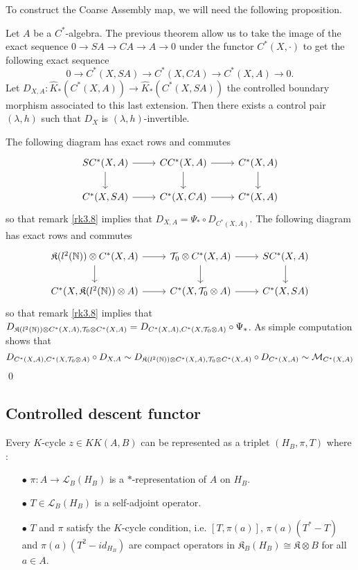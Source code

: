 To construct the Coarse Assembly map, we will need the following proposition. 

\begin{prop}
Let $A$ be a $C^*$-algebra. The previous theorem allow us to take the image of the exact sequence $0 \rightarrow SA \rightarrow CA \rightarrow A \rightarrow 0 $ under the functor $C^*(X,\cdot)$ to get the following exact sequence 
\[0 \rightarrow C^*(X,SA) \rightarrow C^*(X,CA) \rightarrow C^*(X,A) \rightarrow 0.\] 
Let $D_{X,A} : \hat K_*(C^*(X,A))\rightarrow \hat K_*(C^*(X,SA))$ the controlled boundary morphism associated to this last extension. Then there exists a control pair $(\lambda,h)$ such that $D_X$ is $(\lambda,h)$-invertible.
\end{prop}

\begin{dem}
The following diagram has exact rows and commutes
\[\begin{tikzcd} 
SC^*(X,A) \arrow{d}\arrow{r} & CC^*(X,A) \arrow{d}\arrow{r} & C^*(X,A) \arrow{d} \\ 
C^*(X,SA) \arrow{r}          & C^*(X,CA) \arrow{r}          & C^*(X,A)
\end{tikzcd}\]
so that remark \ref{rk3.8} implies that $D_{X,A} = \Psi_*\circ D_{C^*(X,A)}$. The following diagram has exact rows and commutes
\[\begin{tikzcd} 
\mathfrak K(l^2(\N))\otimes C^*(X,A) \arrow{d}\arrow{r} & \mathcal T_0 \otimes C^*(X,A) \arrow{d}\arrow{r} & SC^*(X,A) \arrow{d} \\ 
C^*(X,\mathfrak K(l^2(\N))\otimes A) \arrow{r}          & C^*(X,\mathcal T_0 \otimes A) \arrow{r}          & C^*(X,SA)
\end{tikzcd}\]
so that remark \ref{rk3.8} implies that $D_{\mathfrak K(l^2(\mathbb N))\otimes C^*(X,A),\mathcal T_0\otimes C^*(X,A)} = D_{C^*(X,A),C^*(X,\mathcal T_0\otimes A)}\circ\Psi_*$. As simple computation shows that 
\[D_{C^*(X,A),C^*(X,\mathcal T_0\otimes A)}\circ D_{X,A} \sim D_{\mathfrak K(l^2(\mathbb N))\otimes C^*(X,A),\mathcal T_0\otimes C^*(X,A)}\circ D_{C^*(X,A)} \sim \mathcal M_{C^*(X,A)}\]
\qed
\end{dem}

\subsection{Controlled descent functor}

Every $K$-cycle $z\in KK(A,B)$ can be represented as a triplet $(H_B, \pi, T)$ where :
\begin{itemize}
\item[$\bullet$]$\pi : A\rightarrow \mathcal L_B(H_B)$ is a $*$-representation of $A$ on $H_B$.
\item[$\bullet$]$T\in \mathcal L_B(H_B)$ is a self-adjoint operator.
\item[$\bullet$] $T$ and $\pi$ satisfy the $K$-cycle condition, i.e. $[T,\pi(a)]$, $\pi(a)(T^*-T)$ and $\pi(a)(T^2-id_{H_B})$ are compact operators in $\mathfrak K_B(H_B)\cong \mathfrak K \otimes B$ for all $a\in A$.\\
\end{itemize}

